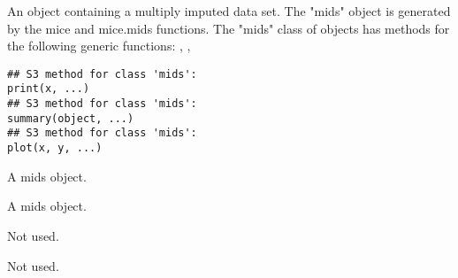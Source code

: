 \begin{Description}\relax
An object containing a multiply imputed data set. The
"mids" object is generated by the mice and mice.mids functions. The
"mids" class of objects has methods for the following generic
functions: , , 
\end{Description}
\begin{Usage}
\begin{verbatim}
## S3 method for class 'mids':
print(x, ...)
## S3 method for class 'mids':
summary(object, ...)
## S3 method for class 'mids':
plot(x, y, ...)
\end{verbatim}
\end{Usage}
\begin{Arguments}
\begin{ldescription}
\item[\code{x}] A mids object.
\item[\code{object}] A mids object.
\item[\code{y}] Not used.
\item[\code{...}] Not used.
\end{ldescription}
\end{Arguments}

